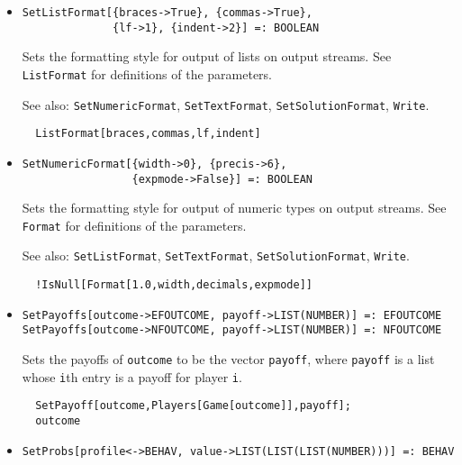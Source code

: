 \begin{itemize}
\item{}
\protect \large \begin{verbatim}
SetListFormat[{braces->True}, {commas->True}, 
              {lf->1}, {indent->2}] =: BOOLEAN 
\end{verbatim} \normalsize

\bd
Sets the formatting style for output of lists on output streams. See
\verb+ListFormat+ for definitions of the parameters. 
\item [See also:] \verb+SetNumericFormat+, \verb+SetTextFormat+,
\verb+SetSolutionFormat+, \verb+Write+.
\begin{verbatim}
  ListFormat[braces,commas,lf,indent]
\end{verbatim} 
\ed

\item{}
\protect \large \begin{verbatim}
SetNumericFormat[{width->0}, {precis->6}, 
                 {expmode->False}] =: BOOLEAN 
\end{verbatim}\normalsize

\bd Sets the formatting style for output of numeric types on output
streams.  See \verb+Format+ for definitions of the parameters.
\item [See also:] \verb+SetListFormat+, \verb+SetTextFormat+, 
\verb+SetSolutionFormat+, \verb+Write+.
\begin{verbatim}
  !IsNull[Format[1.0,width,decimals,expmode]]
\end{verbatim} 
\ed

\item{}
\protect \large \begin{verbatim}
SetPayoffs[outcome->EFOUTCOME, payoff->LIST(NUMBER)] =: EFOUTCOME 
SetPayoffs[outcome->NFOUTCOME, payoff->LIST(NUMBER)] =: NFOUTCOME 
\end{verbatim}\normalsize
 
\bd 

Sets the payoffs of \verb+outcome+ to be the vector \verb+payoff+,
where \verb+payoff+ is a list whose \verb+i+th entry is a payoff for
player \verb+i+.
\begin{verbatim}
  SetPayoff[outcome,Players[Game[outcome]],payoff];
  outcome
\end{verbatim} 
\ed

\item{}
\protect \large \begin{verbatim}
SetProbs[profile<->BEHAV, value->LIST(LIST(LIST(NUMBER)))] =: BEHAV 
\end{verbatim}\normalsize


\end{itemize}
